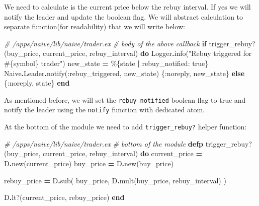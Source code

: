 \documentclass[
]{book}
\newenvironment{Shaded}{\begin{snugshade}}{\end{snugshade}}
\newcommand{\CommentTok}[1]{\textcolor[rgb]{0.56,0.35,0.01}{\textit{#1}}}
\newcommand{\ConstantTok}[1]{\textcolor[rgb]{0.00,0.00,0.00}{#1}}
\newcommand{\ControlFlowTok}[1]{\textcolor[rgb]{0.13,0.29,0.53}{\textbf{#1}}}
\newcommand{\KeywordTok}[1]{\textcolor[rgb]{0.13,0.29,0.53}{\textbf{#1}}}
\newcommand{\NormalTok}[1]{#1}
\newcommand{\OperatorTok}[1]{\textcolor[rgb]{0.81,0.36,0.00}{\textbf{#1}}}
\newcommand{\OtherTok}[1]{\textcolor[rgb]{0.56,0.35,0.01}{#1}}
\newcommand{\StringTok}[1]{\textcolor[rgb]{0.31,0.60,0.02}{#1}}
\newcommand{\VariableTok}[1]{\textcolor[rgb]{0.00,0.00,0.00}{#1}}
\begin{document}
We need to calculate is the current price below the rebuy interval. If yes we will notify the leader and update the boolean flag. We will abstract calculation to separate function(for readability) that we will write below:

\begin{Shaded}
\begin{Highlighting}[]
    \CommentTok{\# /apps/naive/lib/naive/trader.ex}
    \CommentTok{\# body of the above callback}
    \ControlFlowTok{if}\NormalTok{ trigger\_rebuy?(buy\_price, current\_price, rebuy\_interval) }\KeywordTok{do}
      \ConstantTok{Logger}\OperatorTok{.}\NormalTok{info(}\StringTok{"Rebuy triggered for }\OtherTok{\#\{}\NormalTok{symbol}\OtherTok{\}}\StringTok{ trader"}\NormalTok{)}
\NormalTok{      new\_state }\OperatorTok{=}\NormalTok{ \%\{state }\OperatorTok{|} \VariableTok{rebuy\_notified:} \ConstantTok{true}\NormalTok{\}}
      \ConstantTok{Naive}\OperatorTok{.}\ConstantTok{Leader}\OperatorTok{.}\NormalTok{notify(}\VariableTok{:rebuy\_triggered}\NormalTok{, new\_state)}
\NormalTok{      \{}\VariableTok{:noreply}\NormalTok{, new\_state\}}
    \ControlFlowTok{else}
\NormalTok{      \{}\VariableTok{:noreply}\NormalTok{, state\}}
    \KeywordTok{end}
\end{Highlighting}
\end{Shaded}

As mentioned before, we will set the \texttt{rebuy\_notified} boolean flag to true and notify the leader using the \texttt{notify} function with dedicated atom.

At the bottom of the module we need to add \texttt{trigger\_rebuy?} helper function:

\begin{Shaded}
\begin{Highlighting}[]
  \CommentTok{\# /apps/naive/lib/naive/trader.ex}
  \CommentTok{\# bottom of the module}
  \KeywordTok{defp}\NormalTok{ trigger\_rebuy?(buy\_price, current\_price, rebuy\_interval) }\KeywordTok{do}
\NormalTok{    current\_price }\OperatorTok{=}\NormalTok{ D}\OperatorTok{.}\NormalTok{new(current\_price)}
\NormalTok{    buy\_price }\OperatorTok{=}\NormalTok{ D}\OperatorTok{.}\NormalTok{new(buy\_price)}

\NormalTok{    rebuy\_price }\OperatorTok{=}
\NormalTok{      D}\OperatorTok{.}\NormalTok{sub(}
\NormalTok{        buy\_price,}
\NormalTok{        D}\OperatorTok{.}\NormalTok{mult(buy\_price, rebuy\_interval)}
\NormalTok{      )}

\NormalTok{    D}\OperatorTok{.}\NormalTok{lt?(current\_price, rebuy\_price)}
  \KeywordTok{end}
\end{Highlighting}
\end{Shaded}
\end{document}

